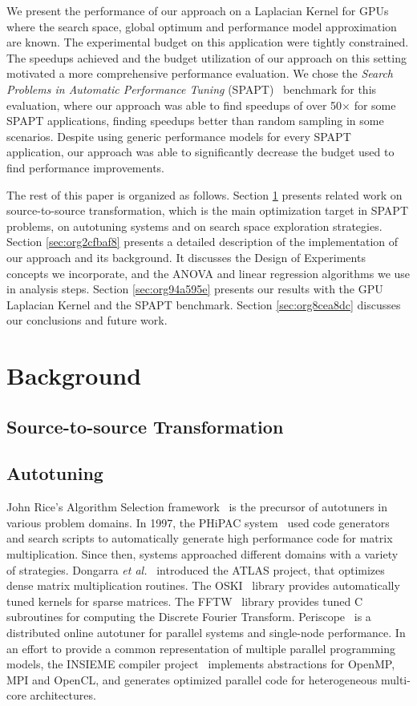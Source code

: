 \documentclass[conference]{IEEEtran}
\begin{document}
We present the performance of our approach on a Laplacian Kernel for GPUs where
the search space, global optimum and performance model approximation are known.
The experimental budget on this application were tightly constrained. The
speedups achieved and the budget utilization of our approach on this setting
motivated a more comprehensive performance evaluation. We chose the \emph{Search
Problems in Automatic Performance Tuning}
(SPAPT)~\cite{balaprakash2012spapt} benchmark for this evaluation, where
our approach was able to find speedups of over 50\(\times\) for some SPAPT
applications, finding speedups better than random sampling in some scenarios.
Despite using generic performance models for every SPAPT application, our
approach was able to significantly decrease the budget used to find performance
improvements.

The rest of this paper is organized as follows. Section \ref{sec:orgfdcbc28} presents
related work on source-to-source transformation, which is the main optimization
target in SPAPT problems, on autotuning systems and on search space exploration
strategies. Section \ref{sec:org2cfbaf8} presents a
detailed description of the implementation of our approach and its background.
It discusses the Design of Experiments concepts we incorporate, and the ANOVA
and linear regression algorithms we use in analysis steps. Section \ref{sec:org94a595e} presents our results with the GPU Laplacian Kernel and the SPAPT
benchmark. Section \ref{sec:org8cea8dc} discusses our conclusions and future work.
\section{Background}
\label{sec:orgfdcbc28}
\subsection{Source-to-source Transformation}
\label{sec:orgf07ad84}
\subsection{Autotuning}
\label{sec:org7242ecf}
John Rice's Algorithm Selection framework~\cite{rice1976algorithm} is the
precursor of autotuners in various problem domains. In 1997, the PHiPAC
system~\cite{bilmes1997optimizing} used code generators and search scripts
to automatically generate high performance code for matrix multiplication. Since
then, systems approached different domains with a variety of strategies.
Dongarra \emph{et al.}~\cite{dongarra1998automatically} introduced the ATLAS
project, that optimizes dense matrix multiplication routines. The
OSKI~\cite{vuduc2005oski} library provides automatically tuned kernels for
sparse matrices. The FFTW~\cite{frigo1998fftw} library provides tuned C
subroutines for computing the Discrete Fourier Transform.
Periscope~\cite{gerndt2010automatic} is a distributed online autotuner for
parallel systems and single-node performance. In an effort to provide a common
representation of multiple parallel programming models, the INSIEME compiler
project~\cite{jordan2012multi} implements abstractions for OpenMP, MPI and
OpenCL, and generates optimized parallel code for heterogeneous multi-core
architectures.
\end{document}
